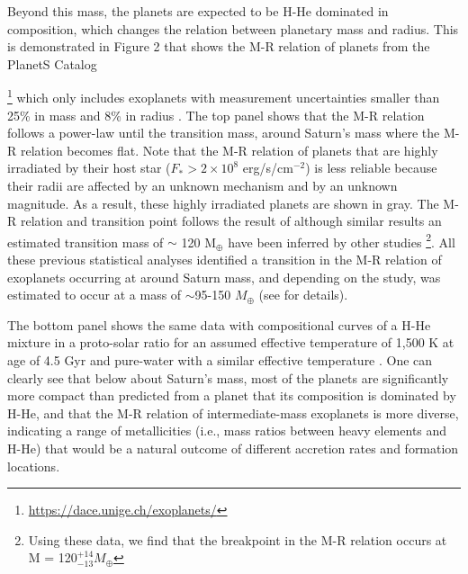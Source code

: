 \documentclass{aa}
\begin{document}
 Beyond this mass, the planets are expected to be H-He dominated in composition, which changes the relation between planetary mass and radius. This is demonstrated in Figure 2 that shows the M-R relation of planets from the PlanetS Catalog{\footnote{\url{https://dace.unige.ch/exoplanets/}} which only includes exoplanets with measurement uncertainties smaller than 25\% in mass and 8\% in radius \citep{2020A&A...634A..43O}. 
 The top panel shows that the M-R relation follows a power-law until the transition mass, around Saturn's mass where the M-R relation becomes flat. Note that the M-R relation of planets that are highly irradiated by their host star ($ F_* > 2 \times 10^8$ erg/s/cm$^{-2}$) is less reliable because their radii are affected by an unknown mechanism and by an unknown magnitude. As a result, these highly irradiated planets are shown in gray. The M-R relation and transition point follows the result of \citet{2017ApJ...834...17C} although similar results an estimated transition mass of 
$\sim$ 120 M$_{\oplus}$ 
 have been inferred by other studies \citep[see e.g.,][]{2013ApJ...768...14W,2015ApJ...810L..25H,2017A&A...604A..83B}\footnote{Using these data, we find that the breakpoint in the M-R relation occurs at M = 120$^{+14}_{-13} M_{\oplus}$}.  
 All these previous statistical analyses identified a transition in the M-R relation of exoplanets occurring at around Saturn mass, and depending on the study, was estimated to occur at a mass of $\sim$95-150 $M_{\oplus}$  (see \citet{2013ApJ...768...14W,2015ApJ...810L..25H,2017ApJ...834...17C,2017A&A...604A..83B} for details).  
\par 

The bottom panel shows the same data with compositional curves of a H-He mixture in a proto-solar ratio for an assumed effective temperature of 1,500 K at age of 4.5 Gyr  \citep{2023A&A...672L...1H} and pure-water with a similar effective temperature \cite{2020A&A...643A.105H}.  One can clearly see that below about Saturn's mass, most of the planets are significantly more compact than predicted from a planet that its composition is dominated by H-He, and that the M-R relation of intermediate-mass exoplanets is more diverse, indicating a range of metallicities (i.e., mass ratios between heavy elements and H-He) that would be a natural outcome of different accretion rates and formation locations. 
\par 

}
\end{document}
